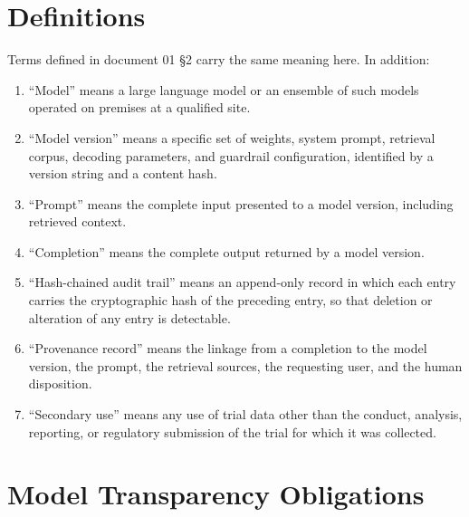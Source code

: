 \section{Definitions}

Terms defined in document 01 §2 carry the same meaning here. In addition:

\begin{enumerate}
\item ``Model'' means a large language model or an ensemble of such models
  operated on premises at a qualified site.

\item ``Model version'' means a specific set of weights, system prompt,
  retrieval corpus, decoding parameters, and guardrail configuration, identified
  by a version string and a content hash.

\item ``Prompt'' means the complete input presented to a model version,
  including retrieved context.

\item ``Completion'' means the complete output returned by a model version.

\item ``Hash-chained audit trail'' means an append-only record in which each
  entry carries the cryptographic hash of the preceding entry, so that deletion
  or alteration of any entry is detectable.

\item ``Provenance record'' means the linkage from a completion to the model
  version, the prompt, the retrieval sources, the requesting user, and the human
  disposition.

\item ``Secondary use'' means any use of trial data other than the conduct,
  analysis, reporting, or regulatory submission of the trial for which it was
  collected.
\end{enumerate}

\section{Model Transparency Obligations}

